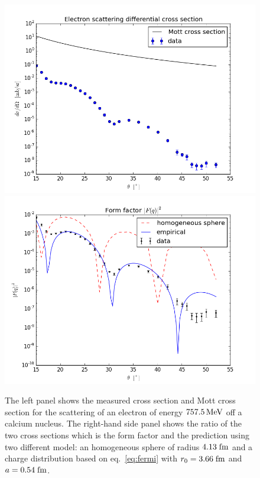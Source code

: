 \documentclass[12pt]{article}
\begin{document}
\begin{figure}
\includegraphics[scale=0.4]{images/CaXsection.png}
\includegraphics[scale=0.4]{images/CaFormFactor.png}
\caption{The left panel shows the measured cross section and Mott cross section for the scattering of an electron of energy $757.5\,\rm{MeV}$ off a calcium nucleus. The right-hand side panel shows the ratio of the two cross sections which is the form factor and the prediction using two different model: an homogeneous sphere of radius $4.13\;\rm{fm}$ and a charge distribution based on eq.~\ref{eq:fermi} with $r_0=3.66\;\rm{fm}$ and $a=0.54\;\rm{fm}$.}\label{fig:CaXsection}
\end{figure}
\end{document}
